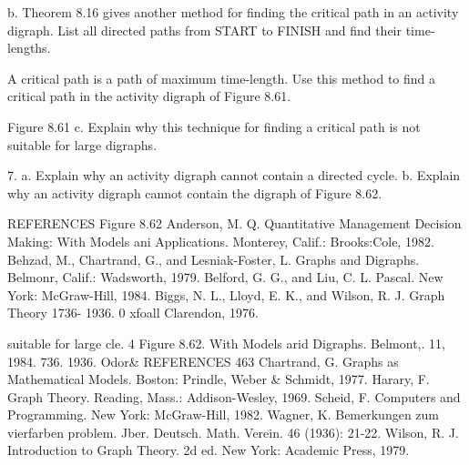 

b. Theorem 8.16 gives another method for finding the critical path in an activity digraph. List all directed paths from START to FINISH and find their time-lengths. 

A critical path is a path of maximum time-length. Use this method to find a critical path in the activity digraph of Figure 8.61. 

Figure 8.61 
c. Explain why this technique for finding a critical path is not suitable for large digraphs. 

7. a. Explain why an activity digraph cannot contain a directed cycle. 
b. Explain why an activity digraph cannot contain the digraph of Figure 8.62. 


REFERENCES 
Figure 8.62 
Anderson, M. Q. Quantitative Management Decision Making: With Models ani Applications. Monterey, Calif.: Brooks:Cole, 1982. Behzad, M., Chartrand, G., and Lesniak-Foster, L. Graphs and Digraphs. Belmonr, Calif.: Wadsworth, 1979. Belford, G. G., and Liu, C. L. Pascal. New York: McGraw-Hill, 1984. Biggs, N. L., Lloyd, E. K., and Wilson, R. J. Graph Theory 1736- 1936. 0 xfoall Clarendon, 1976. 




suitable for large 
cle. 4 Figure 8.62. 
With Models arid Digraphs. Belmont,. 11, 1984. 736. 1936. Odor& 
REFERENCES 463 Chartrand, G. Graphs as Mathematical Models. Boston: Prindle, Weber & Schmidt, 1977. Harary, F. Graph Theory. Reading, Mass.: Addison-Wesley, 1969. Scheid, F. Computers and Programming. New York: McGraw-Hill, 1982. Wagner, K. Bemerkungen zum vierfarben problem. Jber. Deutsch. Math. Verein. 46 (1936): 21-22. Wilson, R. J. Introduction to Graph Theory. 2d ed. New York: Academic Press, 1979. 
